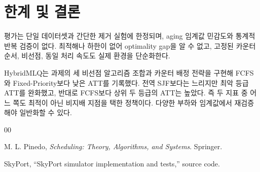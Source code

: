 \documentclass[conference]{IEEEtran}
\begin{document}
\section{한계 및 결론}

평가는 단일 데이터셋과 간단한 제거 실험에 한정되며, aging 임계값 민감도와
통계적 반복 검증이 없다. 최적해나 하한이 없어 optimality gap을 알 수 없고,
고정된 카운터 순서, 비선점, 동일 처리 속도도 실제 환경을 단순화한다.

HybridMLQ는 과제의 세 비선점 알고리즘 조합과 카운터 배정 전략을 구현해
FCFS와 Fixed-Priority보다 낮은 ATT를 기록했다. 전역 SJF보다는 느리지만
최악 등급 ATT를 완화했고, 반대로 FCFS보다 상위 두 등급의 ATT는 높았다.
즉 두 지표 중 어느 쪽도 최적이 아닌 비지배 지점을 택한 정책이다. 다양한
부하와 임계값에서 재검증해야 일반화할 수 있다.

\begin{thebibliography}{00}

M. L. Pinedo, \emph{Scheduling: Theory, Algorithms, and Systems}.
Springer.

SkyPort, ``SkyPort simulator implementation and tests,'' source code.

\end{thebibliography}
\end{document}

